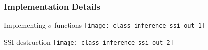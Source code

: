 \begin{frame}
\frametitle{Implementation Details}
\begin{minipage}[t]{0.45\textwidth}
\begin{block}{Implementing $\sigma$-functions}
\hspace{-0.8cm}\texttt{[image: class-inference-ssi-out-1]}
\end{block}
\end{minipage}\hfill
\begin{minipage}[t]{0.45\textwidth}
\begin{block}{SSI destruction}
\texttt{[image: class-inference-ssi-out-2]}
\end{block}
\end{minipage}
\end{frame}

